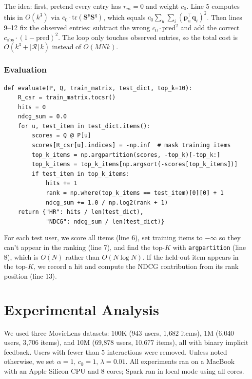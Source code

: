 \documentclass[11pt,a4paper]{article}
\begin{document}
The idea: first, pretend every entry has $r_{ui}=0$ and weight $c_0$. Line 5 computes this in $O(k^3)$ via $c_0 \cdot \text{tr}(\mathbf{S}^p \mathbf{S}^q)$, which equals $c_0 \sum_u \sum_i (\mathbf{p}_u^\top \mathbf{q}_i)^2$. Then lines 9--12 fix the observed entries: subtract the wrong $c_0 \cdot \text{pred}^2$ and add the correct $c_\text{obs} \cdot (1-\text{pred})^2$. The loop only touches observed entries, so the total cost is $O(k^3 + |\mathcal{R}|\,k)$ instead of $O(MNk)$.

\subsubsection{Evaluation}

\begin{lstlisting}[caption={Leave-one-out evaluation with Hit Rate and NDCG.}]
def evaluate(P, Q, train_matrix, test_dict, top_k=10):
    R_csr = train_matrix.tocsr()
    hits = 0
    ndcg_sum = 0.0
    for u, test_item in test_dict.items():
        scores = Q @ P[u]
        scores[R_csr[u].indices] = -np.inf  # mask training items
        top_k_items = np.argpartition(scores, -top_k)[-top_k:]
        top_k_items = top_k_items[np.argsort(-scores[top_k_items])]
        if test_item in top_k_items:
            hits += 1
            rank = np.where(top_k_items == test_item)[0][0] + 1
            ndcg_sum += 1.0 / np.log2(rank + 1)
    return {"HR": hits / len(test_dict),
            "NDCG": ndcg_sum / len(test_dict)}
\end{lstlisting}

For each test user, we score all items (line 6), set training items to $-\infty$ so they can't appear in the ranking (line 7), and find the top-$K$ with \texttt{argpartition} (line 8), which is $O(N)$ rather than $O(N \log N)$. If the held-out item appears in the top-$K$, we record a hit and compute the NDCG contribution from its rank position (line 13).


\section{Experimental Analysis}

We used three MovieLens datasets: 100K (943 users, 1{,}682 items), 1M (6{,}040 users, 3{,}706 items), and 10M (69{,}878 users, 10{,}677 items), all with binary implicit feedback. Users with fewer than 5 interactions were removed. Unless noted otherwise, we set $\alpha = 1$, $c_0 = 1$, $\lambda = 0.01$. All experiments ran on a MacBook with an Apple Silicon CPU and 8 cores; Spark ran in local mode using all cores.
\end{document}
